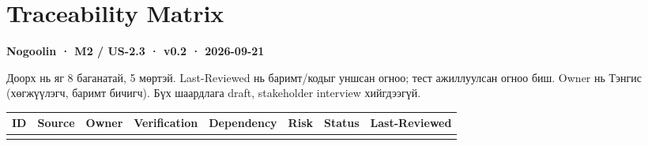 \section{Traceability Matrix}\label{doc5-traceability-matrix}

\textbf{Nogoolin · M2 / US-2.3 · v0.2 · 2026-09-21}

Доорх нь яг 8 баганатай, 5 мөртэй. Last-Reviewed нь баримт/кодыг уншсан
огноо; тест ажиллуулсан огноо биш. Owner нь Тэнгис (хөгжүүлэгч, баримт
бичигч). Бүх шаардлага draft, stakeholder interview хийгдээгүй.

\begin{longtable}[]{@{}
  >{\raggedright\arraybackslash}p{}
  >{\raggedright\arraybackslash}p{}
  >{\raggedright\arraybackslash}p{}
  >{\raggedright\arraybackslash}p{}
  >{\raggedright\arraybackslash}p{}
  >{\raggedright\arraybackslash}p{}
  >{\raggedright\arraybackslash}p{}
  >{\raggedright\arraybackslash}p{}@{}}
\toprule\noalign{}
\begin{minipage}[b]{\linewidth}\raggedright
ID
\end{minipage} & \begin{minipage}[b]{\linewidth}\raggedright
Source
\end{minipage} & \begin{minipage}[b]{\linewidth}\raggedright
Owner
\end{minipage} & \begin{minipage}[b]{\linewidth}\raggedright
Verification
\end{minipage} & \begin{minipage}[b]{\linewidth}\raggedright
Dependency
\end{minipage} & \begin{minipage}[b]{\linewidth}\raggedright
Risk
\end{minipage} & \begin{minipage}[b]{\linewidth}\raggedright
Status
\end{minipage} & \begin{minipage}[b]{\linewidth}\raggedright
Last-Reviewed
\end{minipage} \\
\midrule\noalign{}
\endhead
\bottomrule\noalign{}

\end{longtable}
